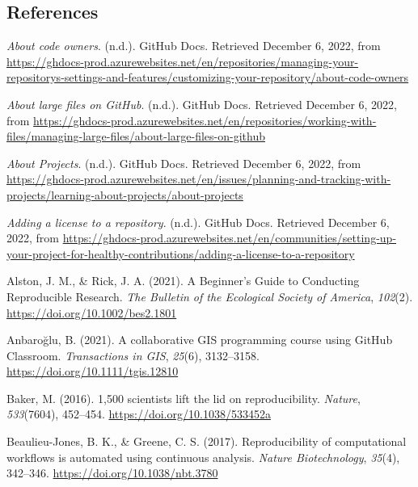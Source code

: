 \hypertarget{references}{%
\subsection{References}\label{references}}

\hypertarget{refs}{}
\begin{CSLReferences}{1}{0}
\leavevmode{}%
\emph{About code owners}. (n.d.). GitHub Docs. Retrieved December 6, 2022, from \url{https://ghdocs-prod.azurewebsites.net/en/repositories/managing-your-repositorys-settings-and-features/customizing-your-repository/about-code-owners}

\leavevmode{}%
\emph{About large files on GitHub}. (n.d.). GitHub Docs. Retrieved December 6, 2022, from \url{https://ghdocs-prod.azurewebsites.net/en/repositories/working-with-files/managing-large-files/about-large-files-on-github}

\leavevmode{}%
\emph{About Projects}. (n.d.). GitHub Docs. Retrieved December 6, 2022, from \url{https://ghdocs-prod.azurewebsites.net/en/issues/planning-and-tracking-with-projects/learning-about-projects/about-projects}

\leavevmode{}%
\emph{Adding a license to a repository}. (n.d.). GitHub Docs. Retrieved December 6, 2022, from \url{https://ghdocs-prod.azurewebsites.net/en/communities/setting-up-your-project-for-healthy-contributions/adding-a-license-to-a-repository}

\leavevmode{}%
Alston, J. M., \& Rick, J. A. (2021). A Beginner's Guide to Conducting Reproducible Research. \emph{The Bulletin of the Ecological Society of America}, \emph{102}(2). \url{https://doi.org/10.1002/bes2.1801}

\leavevmode{}%
Anbaroğlu, B. (2021). A collaborative GIS programming course using GitHub Classroom. \emph{Transactions in GIS}, \emph{25}(6), 3132--3158. \url{https://doi.org/10.1111/tgis.12810}

\leavevmode{}%
Baker, M. (2016). 1,500 scientists lift the lid on reproducibility. \emph{Nature}, \emph{533}(7604), 452--454. \url{https://doi.org/10.1038/533452a}

\leavevmode{}%
Beaulieu-Jones, B. K., \& Greene, C. S. (2017). Reproducibility of computational workflows is automated using continuous analysis. \emph{Nature Biotechnology}, \emph{35}(4), 342--346. \url{https://doi.org/10.1038/nbt.3780}


\end{CSLReferences}
